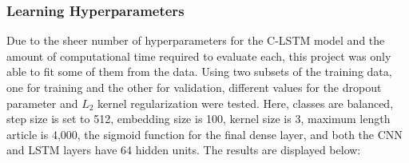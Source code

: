 \documentclass [12 pt] {report}
\begin{document}
\subsubsection*{Learning Hyperparameters}
Due to the sheer number of hyperparameters for the C-LSTM model and the amount of computational time required to evaluate each, this project was only able to fit some of them from the data. Using two subsets of the training data, one for training and the other for validation, different values for the dropout parameter and $L_2$ kernel regularization were tested. Here, classes are balanced, step size is set to 512, embedding size is 100, kernel size is 3, maximum length article is 4,000, the sigmoid function for the final dense layer, and both the CNN and LSTM layers have 64 hidden units. The results are displayed below:
\end{document}
